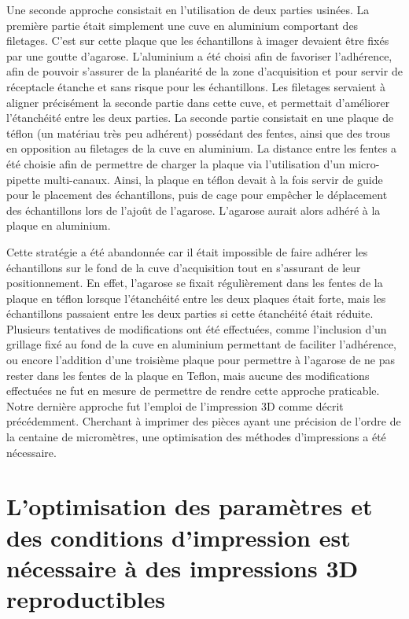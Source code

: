 \documentclass[\main/main.tex]{subfiles}
\begin{document}
%
Une seconde approche consistait en l'utilisation de deux parties usinées.
%
La première partie était simplement une cuve en aluminium comportant des filetages.
%
C'est sur cette plaque que les échantillons à imager devaient être fixés par une goutte d'agarose.
%
L'aluminium a été choisi afin de favoriser l'adhérence, afin de pouvoir s'assurer de la planéarité de la zone d'acquisition et pour servir de réceptacle étanche et sans risque pour les échantillons.
%
Les filetages servaient à aligner précisément la seconde partie dans cette cuve, et permettait d'améliorer l'étanchéité entre les deux parties.
%
La seconde partie consistait en une plaque de téflon (un matériau très peu adhérent) possédant des fentes, ainsi que des trous en opposition au filetages de la cuve en aluminium.
%
La distance entre les fentes a été choisie afin de permettre de charger la plaque via l'utilisation d'un micro-pipette multi-canaux.
%
Ainsi, la plaque en téflon devait à la fois servir de guide pour le placement des échantillons, puis de cage pour empêcher le déplacement des échantillons lors de l'ajoût de l'agarose.
%
L'agarose aurait alors adhéré à la plaque en aluminium.

%
Cette stratégie a été abandonnée car il était impossible de faire adhérer les échantillons sur le fond de la cuve d'acquisition tout en s'assurant de leur positionnement.
%
En effet, l'agarose se fixait régulièrement dans les fentes de la plaque en téflon lorsque l'étanchéité entre les deux plaques était forte, mais les échantillons passaient entre les deux parties si cette étanchéité était réduite.
%
Plusieurs tentatives de modifications ont été effectuées, comme l'inclusion d'un grillage fixé au fond de la cuve en aluminium permettant de faciliter l'adhérence, ou encore l'addition d'une troisième plaque pour permettre à l'agarose de ne pas rester dans les fentes de la plaque en Teflon, mais aucune des modifications effectuées ne fut en mesure de permettre de rendre cette approche praticable.
%
Notre dernière approche fut l'emploi de l'impression 3D comme décrit précédemment.
%
Cherchant à imprimer des pièces ayant une précision de l'ordre de la centaine de micromètres, une optimisation des méthodes d'impressions a été nécessaire. 

    \section{L'optimisation des paramètres et des conditions d'impression est nécessaire à des impressions 3D reproductibles}
\end{document}
